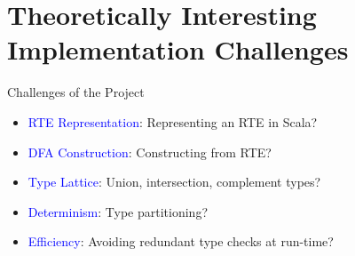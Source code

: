 \section{Theoretically Interesting Implementation Challenges}

{  %
\begin{frame}{Challenges of the Project}
  \begin{itemize}
  \item {} \textcolor{blue}{RTE Representation}:   Representing an RTE in Scala?
  \item {} \textcolor{blue}{DFA Construction}:  Constructing from RTE?
  \item {} \textcolor{blue}{Type Lattice}: Union, intersection, complement types?
  \item {} \textcolor{blue}{Determinism}: Type partitioning?
  \item {} \textcolor{blue}{Efficiency}:  Avoiding redundant type checks at run-time?
  \end{itemize}
\end{frame}
}

